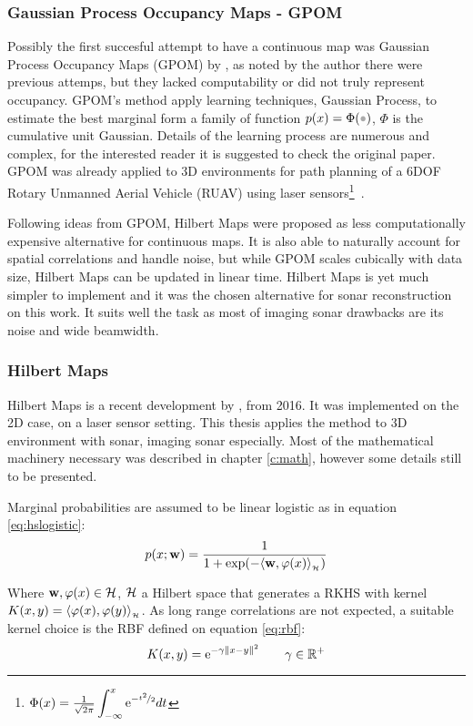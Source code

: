 \subsubsection{Gaussian
Process Occupancy Maps - GPOM}

Possibly the first succesful attempt to have a continuous map was Gaussian
Process Occupancy Maps (GPOM) by \citet{o2012gaussian}, as noted by the author
there were previous attemps, but they lacked computability or did not truly
represent occupancy. GPOM's method apply learning techniques, Gaussian
Process, to estimate the best marginal form a family of function
$p(x)=\Phi(\parm)$, $\Phi$ is the cumulative unit Gaussian. Details of the
learning process are numerous and complex, for the interested reader it is
suggested to check the original paper. GPOM was already applied to 3D
environments for path planning of a 6DOF Rotary Unmanned Aerial Vehicle (RUAV)
using laser
sensors\footnote{$\Phi(x)=\frac{1}{\sqrt{2\pi}}\displaystyle\int_{-\infty}^x \mathrm{e}^{-\nicefrac{t^2}{2}}dt$}~\cite{gan20093d}.

Following ideas from GPOM, Hilbert Maps were proposed as less computationally
expensive alternative for continuous maps. It is also able to naturally account
for spatial correlations and handle noise, but while GPOM scales cubically with
data size, Hilbert Maps can be updated in linear time. Hilbert Maps is yet much
simpler to implement and it was the chosen alternative for sonar reconstruction
on this work. It suits well the task as most of imaging sonar drawbacks are its
noise and wide beamwidth.

\subsubsection{Hilbert Maps}
\label{sss:hilbertcontinuousmap}
Hilbert Maps is a recent development by \citet{ramos2016hilbert}, from 2016. It
was implemented on the 2D case, on a laser sensor setting. This thesis applies
the method to 3D environment with sonar, imaging sonar especially. Most of the
mathematical machinery necessary was described in chapter \ref{c:math}, however
some details still to be presented.

Marginal probabilities are assumed to be linear logistic as in equation
\ref{eq:hslogistic}:
\begin{equation*}
p(x;\mathrm{\mathbf{w}}) = \frac{1}{1+\exp(-\langle \mathrm{\mathbf{w}},\varphi(x)\rangle_{_{\mathcal{H}}})}
\end{equation*}

Where $\mathrm{\mathbf{w}}, \varphi(x)\in\mathcal{H}$, $\mathcal{H}$ a Hilbert space that generates a RKHS
with kernel $K(x,y)=\langle \varphi(x),\varphi(y)\rangle_{_{\mathcal{H}}}$. As long range correlations
are not expected, a suitable kernel choice is the RBF defined on
equation \ref{eq:rbf}:
\begin{equation*}
K(x,y) = \mathrm{e}^{-\gamma\left\lVert x-y\right\rVert^2} \qquad \gamma \in \mathbb{R}^+
\end{equation*}

